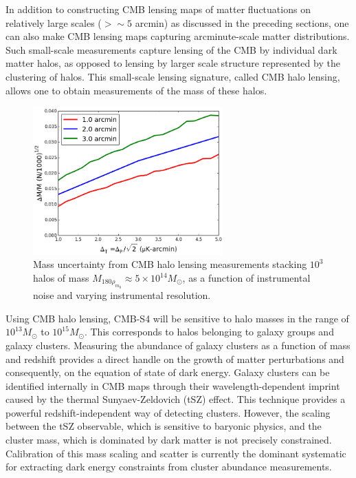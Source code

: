 In addition to constructing CMB lensing maps of matter fluctuations on relatively large scales ($> \sim 5$ arcmin) as discussed in the preceding sections, one can also make CMB lensing maps capturing arcminute-scale matter distributions. Such small-scale measurements capture lensing of the CMB by individual dark matter halos, as opposed to lensing by larger scale structure represented by the clustering of halos.  This small-scale lensing signature, called CMB halo lensing, allows one to obtain measurements of the mass of these halos.  

\begin{figure}[htbp]
\centering 
\includegraphics[width=0.65\textwidth]{CMBLensing/HaloLens.png}
\caption{Mass uncertainty from CMB halo lensing measurements stacking $10^3$ halos of mass $M_{180\rho_{m_0}} \approx 5\times 10^{14} M_{\odot}$, as a function of instrumental noise and varying instrumental resolution.}
\label{haloLens}
\end{figure}

Using CMB halo lensing, CMB-S4 will be sensitive to halo masses in the range of $10^{13} M_{\odot}$ to $10^{15} M_{\odot}$.  This corresponds to halos belonging to galaxy groups and galaxy clusters.  Measuring the abundance of galaxy clusters as a function of mass and redshift provides a direct handle on the growth of matter perturbations and consequently, on the equation of state of dark energy.  Galaxy clusters can be identified internally in CMB maps through their wavelength-dependent imprint caused by the thermal Sunyaev-Zeldovich (tSZ) effect.  This technique provides a powerful redshift-independent way of detecting clusters. However, the scaling between the tSZ observable, which is sensitive to baryonic physics, and the cluster mass, which is dominated by dark matter is not precisely constrained.  Calibration of this mass scaling and scatter is currently the dominant systematic for extracting dark energy constraints from cluster abundance measurements. 

